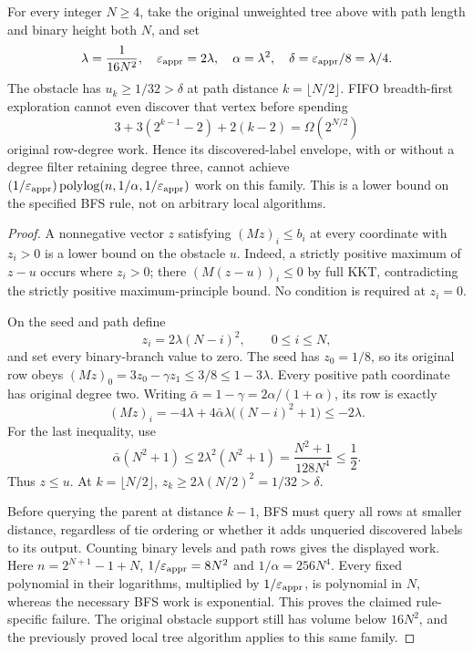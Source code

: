 \begin{proposition}
\label{prop:op3-BFS-envelope-family}
For every integer $N\geq4$, take the original unweighted tree above
with path length and binary height both $N$, and set
\[
 \lambda=\frac1{16N^2},\quad
 \varepsilon_{\mathrm{appr}}=2\lambda,\quad \alpha=\lambda^2,\quad
 \delta=\varepsilon_{\mathrm{appr}}/8=\lambda/4.
\]
The obstacle has $u_k\geq1/32>\delta$ at path distance
$k=\lfloor N/2\rfloor$. FIFO breadth-first exploration cannot even
discover that vertex before spending
\[
 3+3(2^{k-1}-2)+2(k-2)=\Omega(2^{N/2})
\]
original row-degree work. Hence its discovered-label envelope, with
or without a degree filter retaining degree three, cannot achieve
$(1/\varepsilon_{\mathrm{appr}})\operatorname{polylog}(n,1/\alpha,1/\varepsilon_{\mathrm{appr}})$
work on this family. This is a lower bound on the specified BFS rule,
not on arbitrary local algorithms.
\end{proposition}
\begin{proof}
A nonnegative vector $z$ satisfying $(Mz)_i\leq b_i$ at every
coordinate with $z_i>0$ is a lower bound on the obstacle $u$.
Indeed, a strictly positive maximum of $z-u$ occurs where $z_i>0$;
there $(M(z-u))_i\leq0$ by full KKT, contradicting the strictly
positive maximum-principle bound. No condition is required at $z_i=0$.

On the seed and path define
\[
 z_i=2\lambda(N-i)^2,\qquad 0\leq i\leq N,
\]
and set every binary-branch value to zero. The seed has $z_0=1/8$,
so its original row obeys
$(Mz)_0=3z_0-\gamma z_1\leq3/8\leq1-3\lambda$.
Every positive path coordinate has original degree two. Writing
$\bar\alpha=1-\gamma=2\alpha/(1+\alpha)$, its row is exactly
\[
 (Mz)_i=-4\lambda+
 4\bar\alpha\lambda\bigl((N-i)^2+1\bigr)\leq-2\lambda.
\]
For the last inequality, use
\[
 \bar\alpha(N^2+1)\leq2\lambda^2(N^2+1)
 =\frac{N^2+1}{128N^4}\leq\frac12.
\]
Thus $z\leq u$. At $k=\lfloor N/2\rfloor$,
$z_k\geq2\lambda(N/2)^2=1/32>\delta$.

Before querying the parent at distance $k-1$, BFS must query all
rows at smaller distance, regardless of tie ordering or whether it
adds unqueried discovered labels to its output. Counting binary levels
and path rows gives the displayed work. Here
$n=2^{N+1}-1+N$, $1/\varepsilon_{\mathrm{appr}}=8N^2$ and
$1/\alpha=256N^4$. Every fixed polynomial in their logarithms,
multiplied by $1/\varepsilon_{\mathrm{appr}}$, is polynomial in $N$, whereas the necessary
BFS work is exponential. This proves the claimed rule-specific failure.
The original obstacle support still has volume below $16N^2$, and
the previously proved local tree algorithm applies to this same family.
\end{proof}
